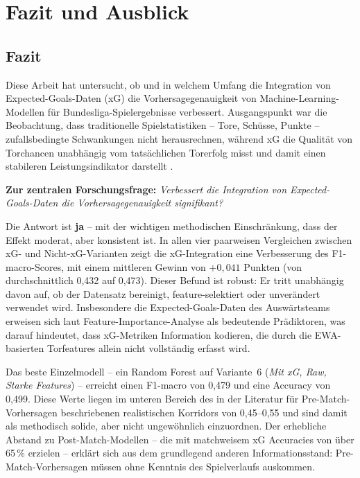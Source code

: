 
\chapter{Fazit und Ausblick}\label{chap:fazit}

\section{Fazit}
\label{sec:fazit}

Diese Arbeit hat untersucht, ob und in welchem Umfang die Integration von
Expected-Goals-Daten (xG) die Vorhersagegenauigkeit von Machine-Learning-Modellen
für Bundesliga-Spielergebnisse verbessert. Ausgangspunkt war die Beobachtung,
dass traditionelle Spielstatistiken -- Tore, Schüsse, Punkte -- zufallsbedingte
Schwankungen nicht herausrechnen, während xG die Qualität von Torchancen
unabhängig vom tatsächlichen Torerfolg misst und damit einen stabileren
Leistungsindikator darstellt \cite{AnzerBauer2021,Wheatcroft2022}.

\textbf{Zur zentralen Forschungsfrage:} \emph{Verbessert die Integration
von Expected-Goals-Daten die Vorhersagegenauigkeit signifikant?}

Die Antwort ist \textbf{ja} -- mit der wichtigen methodischen Einschränkung,
dass der Effekt moderat, aber konsistent ist. In allen vier paarweisen
Vergleichen zwischen xG- und Nicht-xG-Varianten zeigt die xG-Integration
eine Verbesserung des F1-macro-Scores, mit einem mittleren Gewinn von
$+0{,}041$ Punkten (von durchschnittlich 0,432 auf 0,473). Dieser Befund
ist robust: Er tritt unabhängig davon auf, ob der Datensatz bereinigt,
feature-selektiert oder unverändert verwendet wird. Insbesondere die
Expected-Goals-Daten des Auswärtsteams erweisen sich laut
Feature-Importance-Analyse als bedeutende Prädiktoren, was darauf hindeutet,
dass xG-Metriken Information kodieren, die durch die EWA-basierten
Torfeatures allein nicht vollständig erfasst wird.

Das beste Einzelmodell -- ein Random Forest auf Variante~6 (\emph{Mit xG,
Raw, Starke Features}) -- erreicht einen F1-macro von 0,479 und eine
Accuracy von 0,499. Diese Werte liegen im unteren Bereich des in der
Literatur für Pre-Match-Vorhersagen beschriebenen realistischen Korridors
von 0,45--0,55 \cite{BunkerThabtah2019,HubacekSourekZelezny2019} und sind
damit als methodisch solide, aber nicht ungewöhnlich einzuordnen. Der
erhebliche Abstand zu Post-Match-Modellen -- die mit matchweisem xG
Accuracies von über 65\,\% erzielen \cite{ForcherEtAl2025} -- erklärt sich
aus dem grundlegend anderen Informationsstand: Pre-Match-Vorhersagen müssen
ohne Kenntnis des Spielverlaufs auskommen.

